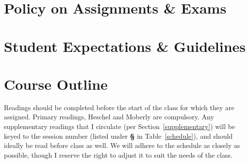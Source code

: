 \documentclass[titlepage]{article}
\newcommand\policy{../policy}
\begin{document}


\section{Policy on Assignments \& Exams}
\label{policy}





\section{Student Expectations \& Guidelines}
\label{expectations}







\section{Course Outline}
\label{outline}

Readings should be completed before the start of the class for which
they are assigned. Primary readings, Heschel and Moberly are compulsory.
Any supplementary readings that I circulate (per
Section~\ref{supplementary}) will be keyed to the session number (listed
under \textbf{\S} in Table~\ref{schedule}), and should ideally be read
before class as well. We will adhere to the schedule as closely as
possible, though I reserve the right to adjust it to suit the needs of
the class.

\newcommand\Yhwh{\textsc{Yhwh}}
\newcommand\rarr{\char"2192\hspace*{0.5pt}}
\end{document}

